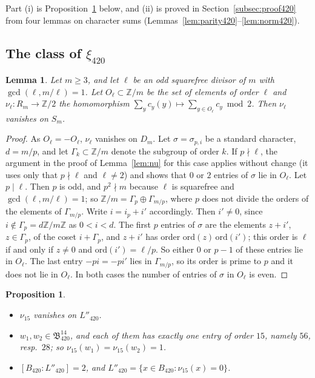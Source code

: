 \documentclass[11pt]{amsart}
\newtheorem{proposition}[theorem]{Proposition}
\newtheorem{lemma}[theorem]{Lemma}
\theoremstyle{definition}
\theoremstyle{remark}
\numberwithin{equation}{section}
\newcommand{\Z}{\mathbb{Z}}
\newcommand{\fB}{\mathfrak{B}}
\begin{document}
Part (i) is Proposition~\ref{prop:index420} below, and (ii) is proved in Section~\ref{subsec:proof420} from four lemmas on character sums (Lemmas~\ref{lem:parity420}--\ref{lem:norm420}).

\subsection{\texorpdfstring{The class of $\xi_{420}$}{The class of xi(420)}}

\begin{lemma}\label{lem:nuodd}
Let $m\ge3$, and let $\ell$ be an odd squarefree divisor of $m$ with $\gcd(\ell,m/\ell)=1$. Let $O_\ell\subset\Z/m$ be the set of elements of order $\ell$ and $\nu_\ell\colon R_m\to\Z/2$ the homomorphism $\sum_yc_y(y)\mapsto\sum_{y\in O_\ell}c_y\bmod2$. Then $\nu_\ell$ vanishes on $S_m$.
\end{lemma}

\begin{proof}
As $O_\ell=-O_\ell$, $\nu_\ell$ vanishes on $D_m$. Let $\sigma=\sigma_{p,i}$ be a standard character, $d=m/p$, and let $\Gamma_k\subset\Z/m$ denote the subgroup of order $k$. If $p\nmid\ell$, the argument in the proof of Lemma~\ref{lem:nu} for this case applies without change (it uses only that $p\nmid\ell$ and $\ell\ne2$) and shows that $0$ or $2$ entries of $\sigma$ lie in $O_\ell$. Let $p\mid\ell$. Then $p$ is odd, and $p^2\nmid m$ because $\ell$ is squarefree and $\gcd(\ell,m/\ell)=1$; so $\Z/m=\Gamma_p\oplus\Gamma_{m/p}$, where $p$ does not divide the orders of the elements of $\Gamma_{m/p}$. Write $i=i_p+i'$ accordingly. Then $i'\ne0$, since $i\notin\Gamma_p=d\Z/m\Z$ as $0<i<d$. The first $p$ entries of $\sigma$ are the elements $z+i'$, $z\in\Gamma_p$, of the coset $i+\Gamma_p$, and $z+i'$ has order $\mathrm{ord}(z)\,\mathrm{ord}(i')$; this order is $\ell$ if and only if $z\ne0$ and $\mathrm{ord}(i')=\ell/p$. So either $0$ or $p-1$ of these entries lie in $O_\ell$. The last entry $-pi=-pi'$ lies in $\Gamma_{m/p}$, so its order is prime to $p$ and it does not lie in $O_\ell$. In both cases the number of entries of $\sigma$ in $O_\ell$ is even.
\end{proof}

\begin{proposition}\label{prop:index420}
\begin{itemize}
\item[(a)] $\nu_{15}$ vanishes on $L''_{420}$.
\item[(b)] $w_1,w_2\in\fB^{14}_{420}$, and each of them has exactly one entry of order $15$, namely $56$, resp.\ $28$; so $\nu_{15}(w_1)=\nu_{15}(w_2)=1$.
\item[(c)] $[B_{420}:L''_{420}]=2$, and $L''_{420}=\{x\in B_{420}:\nu_{15}(x)=0\}$.
\end{itemize}
\end{proposition}
\end{document}
